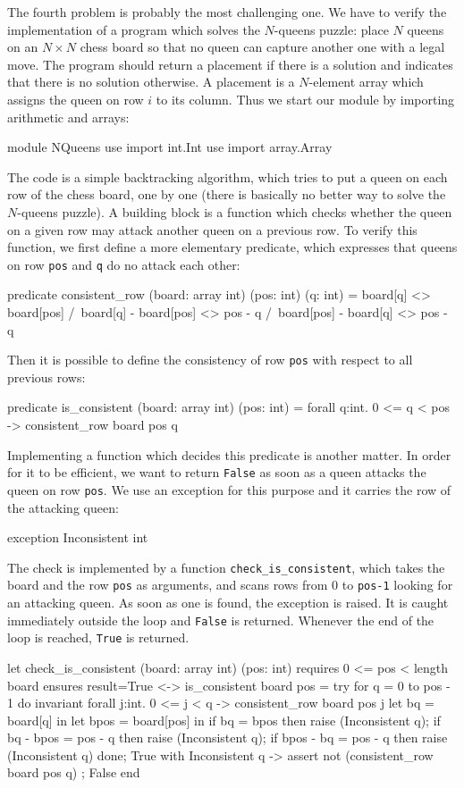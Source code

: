 The fourth problem is probably the most challenging one.
We have to verify the implementation of a program which solves the
$N$-queens puzzle: place $N$ queens on an $N \times N$
chess board so that no queen can capture another one with a
legal move.
The program should return a placement if there is a solution and
indicates that there is no solution otherwise. A placement is a
$N$-element array which assigns the queen on row $i$ to its column.
Thus we start our module by importing arithmetic and arrays:
\begin{whycode}
module NQueens
  use import int.Int
  use import array.Array
\end{whycode}
The code is a simple backtracking algorithm, which tries to put a queen
on each row of the chess board, one by one (there is basically no
better way to solve the $N$-queens puzzle).
A building block is a function which checks whether the queen on a
given row may attack another queen on a previous row. To verify this
function, we first define a more elementary predicate, which expresses
that queens on row \texttt{pos} and \texttt{q} do no attack each other:
\begin{whycode}
  predicate consistent_row (board: array int) (pos: int) (q: int) =
    board[q] <> board[pos] /\
    board[q] - board[pos] <> pos - q /\
    board[pos] - board[q] <> pos - q
\end{whycode}
Then it is possible to define the consistency of row \texttt{pos}
with respect to all previous rows:
\begin{whycode}
  predicate is_consistent (board: array int) (pos: int) =
    forall q:int. 0 <= q < pos -> consistent_row board pos q
\end{whycode}
Implementing a function which decides this predicate is another
matter. In order for it to be efficient, we want to return
\texttt{False} as soon as a queen attacks the queen on row
\texttt{pos}. We use an exception for this purpose and it carries the
row of the attacking queen:
\begin{whycode}
  exception Inconsistent int
\end{whycode}
The check is implemented by a function \verb|check_is_consistent|,
which takes the board and the row \texttt{pos} as arguments, and scans
rows from 0 to \texttt{pos-1} looking for an attacking queen. As soon
as one is found, the exception is raised. It is caught immediately
outside the loop and \texttt{False} is returned. Whenever the end of
the loop is reached, \texttt{True} is returned.
\begin{whycode}
  let check_is_consistent (board: array int) (pos: int)
    requires { 0 <= pos < length board }
    ensures  { result=True <-> is_consistent board pos }
  = try
      for q = 0 to pos - 1 do
        invariant {
          forall j:int. 0 <= j < q -> consistent_row board pos j
        }
        let bq   = board[q]   in
        let bpos = board[pos] in
        if bq        = bpos    then raise (Inconsistent q);
        if bq - bpos = pos - q then raise (Inconsistent q);
        if bpos - bq = pos - q then raise (Inconsistent q)
      done;
      True
    with Inconsistent q ->
      assert { not (consistent_row board pos q) };
      False
    end
\end{whycode}
